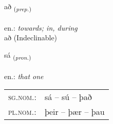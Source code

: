 \documentclass[frontgrid, backgrid]{flacards}\usepackage[]{graphicx}\usepackage[]{xcolor}
\begin{document}
\renewcommand{\blhead}{\vskip5pt {\small\bfseries\footnotesize Forsetning | Preposition }}
\renewcommand{\bcfoot}{\vskip5pt \hspace{2pt}{\small\bfseries\footnotesize 1K}}


{að \small{\textsubscript{(\textit{prep.})}} \\[1ex]
\textphonetic{[aːð]} \\
en.: \emph{towards; in, during} \\  [2ex]
að (Indeclinable)}

\renewcommand{\flhead}{\vskip5pt \fboxsep=0pt {\small\bfseries\footnotesize Fornafn | Pronoun}}
\renewcommand{\fcfoot}{\vskip5pt \fboxsep=0pt \hspace{2pt}{\small\bfseries\footnotesize 1K}}

\renewcommand{\blhead}{\vskip5pt {\small\bfseries\footnotesize Fornafn | Pronoun }}
\renewcommand{\bcfoot}{\vskip5pt \hspace{2pt}{\small\bfseries\footnotesize 1K}}


{sá \small{\textsubscript{(\textit{pron.})}} \\[1ex] %
\textphonetic{[sauː]} \\
en.: \emph{that one} \\  [2ex]
\renewcommand*{\arraystretch}{0.8}
\begin{tabular}{ll}
\textsc{sg.nom.}: & sá  --  sú -- það \\ 
\textsc{pl.nom.}: & þeir -- þær -- þau
\end{tabular}
}

\renewcommand{\flhead}{\vskip5pt \fboxsep=0pt {\small\bfseries\footnotesize Sagnorð | Verb}}
\renewcommand{\fcfoot}{\vskip5pt \fboxsep=0pt \hspace{2pt}{\small\bfseries\footnotesize 1K}}

\renewcommand{\blhead}{\vskip5pt {\small\bfseries\footnotesize Sagnorð | Verb }}
\renewcommand{\bcfoot}{\vskip5pt \hspace{2pt}{\small\bfseries\footnotesize 1K}}
\end{document}
